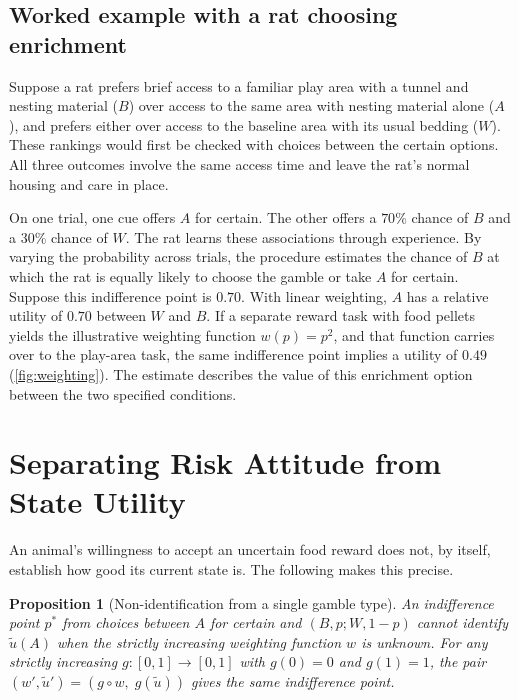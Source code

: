 \documentclass[11pt,a4paper]{article}
\newtheorem{proposition}{Proposition}
\begin{document}
\subsection{Worked example with a rat choosing enrichment}
\label{sec:rat-example}

Suppose a rat prefers brief access to a familiar play area with a tunnel and nesting material ($B$) over access to the same area with nesting material alone ($A$), and prefers either over access to the baseline area with its usual bedding ($W$). These rankings would first be checked with choices between the certain options. All three outcomes involve the same access time and leave the rat's normal housing and care in place.

On one trial, one cue offers $A$ for certain. The other offers a $70\%$ chance of $B$ and a $30\%$ chance of $W$. The rat learns these associations through experience. By varying the probability across trials, the procedure estimates the chance of $B$ at which the rat is equally likely to choose the gamble or take $A$ for certain. Suppose this indifference point is $0.70$. With linear weighting, $A$ has a relative utility of $0.70$ between $W$ and $B$. If a separate reward task with food pellets yields the illustrative weighting function $w(p)=p^2$, and that function carries over to the play-area task, the same indifference point implies a utility of $0.49$ (\cref{fig:weighting}). The estimate describes the value of this enrichment option between the two specified conditions.

\section{Separating Risk Attitude from State Utility}
\label{sec:separation}

An animal's willingness to accept an uncertain food reward does not, by itself, establish how good its current state is. The following makes this precise.

\begin{proposition}[Non-identification from a single gamble type]
\label{prop:nonid}
An indifference point $p^\ast$ from choices between $A$ for certain and $(B,p;W,1-p)$ cannot identify $\tilde u(A)$ when the strictly increasing weighting function $w$ is unknown. For any strictly increasing $g:[0,1]\to[0,1]$ with $g(0)=0$ and $g(1)=1$, the pair $(w',\tilde u')=(g\circ w,\;g(\tilde u))$ gives the same indifference point.
\end{proposition}
\end{document}
